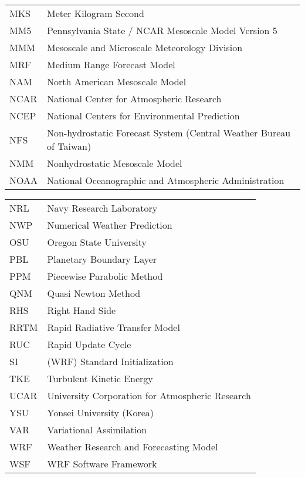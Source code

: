 \begin{tabular}[t]{ll}
MKS & Meter Kilogram Second \\
MM5 & Pennsylvania State / NCAR Mesoscale Model Version 5 \\
MMM & Mesoscale and Microscale Meteorology Division \\
MRF & Medium Range Forecast Model \\
NAM & North American Mesoscale Model \\
NCAR & National Center for Atmospheric Research \\
NCEP & National Centers for Environmental Prediction \\
NFS & Non-hydrostatic Forecast System (Central Weather Bureau of Taiwan) \\
NMM & Nonhydrostatic Mesoscale Model \\
NOAA & National Oceanographic and Atmospheric Administration \\
\end{tabular}
\newpage
\normalsize
\begin{tabular}[t]{ll}
NRL & Navy Research Laboratory \\
NWP & Numerical Weather Prediction \\
OSU & Oregon State University \\
PBL & Planetary Boundary Layer \\
PPM & Piecewise Parabolic Method \\
QNM & Quasi Newton Method \\
RHS & Right Hand Side \\
RRTM & Rapid Radiative Transfer Model \\
RUC & Rapid Update Cycle \\
SI & (WRF) Standard Initialization\\
TKE & Turbulent Kinetic Energy \\
UCAR & University Corporation for Atmospheric Research \\
YSU & Yonsei University (Korea) \\
VAR & Variational Assimilation \\
WRF & Weather Research and Forecasting Model \\
WSF & WRF Software Framework \\
\end{tabular}
